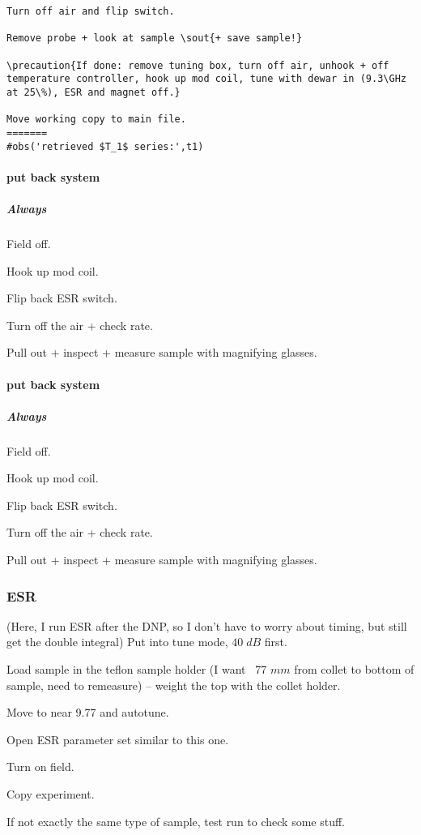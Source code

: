 \begin{scriptsize}
\begin{python}[off]
\begin{scriptsize}
\begin{lstlisting}
Turn off air and flip switch.

Remove probe + look at sample \sout{+ save sample!}

\precaution{If done: remove tuning box, turn off air, unhook + off temperature controller, hook up mod coil, tune with dewar in (9.3\GHz at 25\%), ESR and magnet off.}

Move working copy to main file.
=======
#obs('retrieved $T_1$ series:',t1)
\end{lstlisting}
\end{scriptsize}
\paragraph{put back system}
\subparagraph{Always}
Field off.

Hook up mod coil.

Flip back ESR switch.

Turn off the air + check rate.

Pull out + inspect + measure sample with magnifying glasses.

\paragraph{put back system}
\subparagraph{Always}
Field off.

Hook up mod coil.

Flip back ESR switch.

Turn off the air + check rate.

Pull out + inspect + measure sample with magnifying glasses.

\subsubsection{ESR}

(Here, I run ESR after the DNP, so I don't have to worry about timing, but still get the double integral)
Put into tune mode, $40\;dB$ first.

Load sample in the teflon sample holder (I want ~77 $mm$ from collet to bottom of sample, need to remeasure) -- weight the top with the collet holder.

Move to near 9.77 and autotune.

Open ESR parameter set similar to this one.

Turn on field.

Copy experiment.

If not exactly the same type of sample, test run to check some stuff.


\end{python}
\end{scriptsize}
